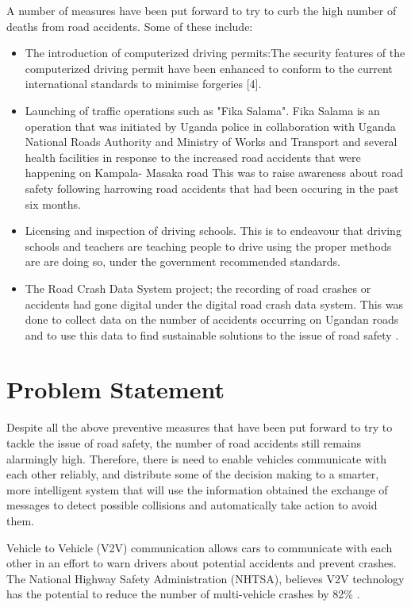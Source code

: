 \documentclass[12pt]{report}
\begin{document}
A number of measures have been put forward to try to curb the high number of deaths from road accidents. Some of these include:
	\begin{itemize}
		\item The introduction of computerized driving permits:The security features of the computerized driving permit have been enhanced to conform to the current international standards to minimise forgeries [4].
		\item Launching of traffic operations such as "Fika Salama". Fika Salama is an operation that was initiated by Uganda police in collaboration with Uganda National Roads Authority and Ministry of Works and Transport and several health facilities in response to the increased road accidents that were happening on Kampala- Masaka road \cite{fikasalama} This was to raise awareness about road safety following harrowing road accidents that had been occuring in the past six months.
		\item Licensing and inspection of driving schools. This is to endeavour that driving schools and teachers are teaching people to drive using the proper methods are are doing so, under the government recommended standards.
		\item The Road Crash Data System project; the recording of road crashes or accidents had gone digital under the digital road crash data system. This was done to collect data on the number of accidents occurring on Ugandan roads and to use this data to find sustainable solutions to the issue of road safety \cite{road}.
	\end{itemize}

\section{Problem Statement}
Despite all the above preventive measures that have been put forward to try to tackle the issue of road safety, the number of road accidents still remains alarmingly high. Therefore, there is need to enable vehicles communicate with each other reliably, and distribute some of the decision making to a smarter, more intelligent system that will use the information obtained the exchange of messages to detect possible collisions and automatically take action to avoid them.

Vehicle to Vehicle (V2V) communication allows cars to communicate
with each other in an effort to warn drivers about potential accidents and prevent crashes.
The National Highway Safety Administration (NHTSA), believes V2V
technology has the potential to reduce the number of multi-vehicle crashes by 82\% \cite{talk}.
\end{document}
